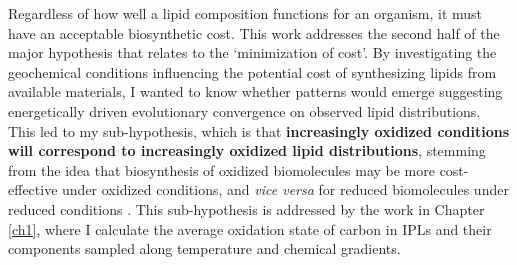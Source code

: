 Regardless of how well a lipid composition functions for an organism, it must have an acceptable biosynthetic cost. This work addresses the second half of the major hypothesis that relates to the `minimization of cost'. By investigating the geochemical conditions influencing the potential cost of synthesizing lipids from available materials, I wanted to know whether patterns would emerge suggesting energetically driven evolutionary convergence on observed lipid distributions. This led to my sub-hypothesis, which is that \textbf{increasingly oxidized conditions will correspond to increasingly oxidized lipid distributions}, stemming from the idea that biosynthesis of oxidized biomolecules may be more cost-effective under oxidized conditions, and \textit{vice versa} for reduced biomolecules under reduced conditions \citep{amend1998energetics, shock2010potential, dick2011calculation, dick2013metastable}. This sub-hypothesis is addressed by the work in Chapter \ref{ch1}, where I calculate the average oxidation state of carbon in IPLs and their components sampled along temperature and chemical gradients.

